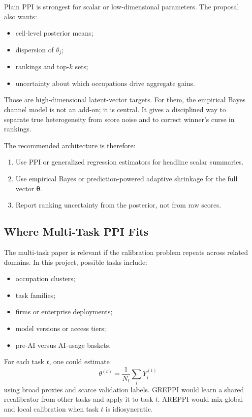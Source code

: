 \documentclass[11pt]{article}
\newcommand{\thetav}{\boldsymbol{\theta}}
\begin{document}
Plain PPI is strongest for scalar or low-dimensional parameters. The proposal also wants:
\begin{itemize}[leftmargin=*]
  \item cell-level posterior means;
  \item dispersion of $\theta_j$;
  \item rankings and top-$k$ sets;
  \item uncertainty about which occupations drive aggregate gains.
\end{itemize}
Those are high-dimensional latent-vector targets. For them, the empirical Bayes channel model is not an add-on; it is central. It gives a disciplined way to separate true heterogeneity from score noise and to correct winner's curse in rankings.

The recommended architecture is therefore:
\begin{enumerate}[leftmargin=*]
  \item Use PPI or generalized regression estimators for headline scalar summaries.
  \item Use empirical Bayes or prediction-powered adaptive shrinkage for the full vector $\thetav$.
  \item Report ranking uncertainty from the posterior, not from raw scores.
\end{enumerate}

\subsection{Where Multi-Task PPI Fits}

The multi-task paper is relevant if the calibration problem repeats across related domains. In this project, possible tasks include:
\begin{itemize}[leftmargin=*]
  \item occupation clusters;
  \item task families;
  \item firms or enterprise deployments;
  \item model versions or access tiers;
  \item pre-AI versus AI-usage baskets.
\end{itemize}

For each task $t$, one could estimate
\[
  \theta^{(t)}=\frac{1}{N_t}\sum_i Y_i^{(t)}
\]
using broad proxies and scarce validation labels. GREPPI would learn a shared recalibrator from other tasks and apply it to task $t$. AREPPI would mix global and local calibration when task $t$ is idiosyncratic.
\end{document}
